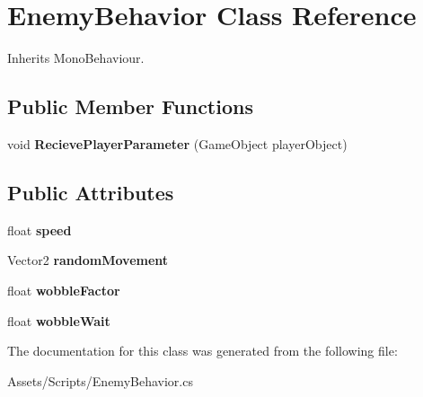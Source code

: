 \hypertarget{class_enemy_behavior}{}\section{Enemy\+Behavior Class Reference}
\label{class_enemy_behavior}


Inherits Mono\+Behaviour.

\subsection*{Public Member Functions}
\begin{DoxyCompactItemize}
\item 
\mbox{\label{class_enemy_behavior_a1a0d6efe8ce9e53a0e4bddd06c379097}} 
void {\bfseries Recieve\+Player\+Parameter} (Game\+Object player\+Object)
\end{DoxyCompactItemize}
\subsection*{Public Attributes}
\begin{DoxyCompactItemize}
\item 
\mbox{\label{class_enemy_behavior_a1c7f38d162cec582d736b2b7d7d0ac6b}} 
float {\bfseries speed}
\item 
\mbox{\label{class_enemy_behavior_a6f9339ebbcc8c5ad4e538d52bfde73c1}} 
Vector2 {\bfseries random\+Movement}
\item 
\mbox{\label{class_enemy_behavior_a80484f747dfb85a8063a50dd115f65e0}} 
float {\bfseries wobble\+Factor}
\item 
\mbox{\label{class_enemy_behavior_ade5bcff77085ea22523d28312c252d75}} 
float {\bfseries wobble\+Wait}
\end{DoxyCompactItemize}


The documentation for this class was generated from the following file\+:\begin{DoxyCompactItemize}
\item 
Assets/\+Scripts/Enemy\+Behavior.\+cs\end{DoxyCompactItemize}
